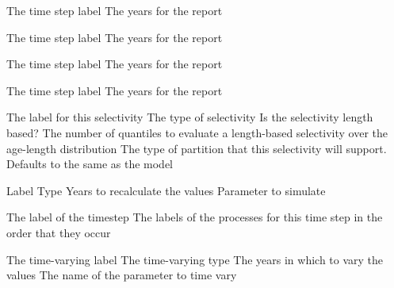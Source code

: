 \par\textbf{}\par
{} {The time step label}
 {The years for the report}
\par\textbf{}\par
{} {The time step label}
 {The years for the report}
\par\textbf{}\par
{} {The time step label}
 {The years for the report}
\par\textbf{}\par
{} {The time step label}
 {The years for the report}
\par\textbf{}\par
{}\par\par
{} {The label for this selectivity}
 {The type of selectivity}
 {Is the selectivity length based?}
 {The number of quantiles to evaluate a length-based selectivity over the age-length distribution}
 {The type of partition that this selectivity will support. Defaults to the same as the model}
 {}
 {}
\par\par
{} {Label}
 {Type}
 {Years to recalculate the values}
 {Parameter to simulate}
\par\par
{} {The label of the timestep}
 {The labels of the processes for this time step in the order that they occur}
\par\par
{} {The time-varying label}
 {The time-varying type}
 {The years in which to vary the values}
 {The name of the parameter to time vary}
